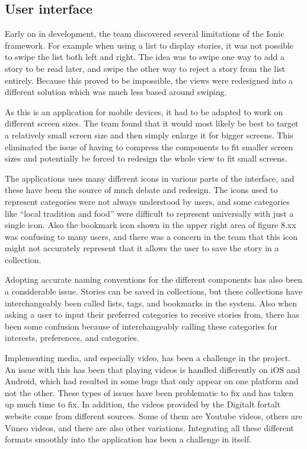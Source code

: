 \subsection{User interface}

Early on in development, the team discovered several limitations of the Ionic framework. For example when using a list to display stories, it was not possible to swipe the list both left and right. The idea was to swipe one way to add a story to be read later, and swipe the other way to reject a story from the list entirely.  Because this proved to be impossible, the views were redesigned into a different solution which was much less based around swiping.\newline

As this is an application for mobile devices, it had to be adapted to work on different screen sizes. The team found that it would most likely be best to target a relatively small screen size and then simply enlarge it for bigger screens. This eliminated the issue of having to compress the components to fit smaller screen sizes and potentially be forced to redesign the whole view to fit small screens.\newline

The applications uses many different icons in various parts of the interface, and these have been the source of much debate and redesign. The icons used to represent categories were not always understood by users, and some categories like “local tradition and food” were difficult to represent universally with just a single icon. Also the bookmark icon shown in the upper right area of figure 8.xx was confusing to many users, and there was a concern in the team that this icon might not accurately represent that it allows the user to save the story in a collection.\newline

Adopting accurate naming conventions for the different components has also been a considerable issue. Stories can be saved in collections, but these collections have interchangeably been called lists, tags, and bookmarks in the system. Also when asking a user to input their preferred categories to receive stories from, there has been some confusion because of interchangeably calling these categories for interests,  preferences, and categories.\newline

Implementing media, and especially video, has been a challenge in the project. An issue with this has been that playing videos is handled differently on iOS and Android, which had resulted in some bugs that only appear on one platform and not the other. These types of issues have been problematic to fix and has taken up much time to fix. In addition, the videos provided by the Digitalt fortalt website come from different sources. Some of them are Youtube videos, others are Vimeo videos, and there are also other variations. Integrating all these different formats smoothly into the application has been a challenge in itself.

